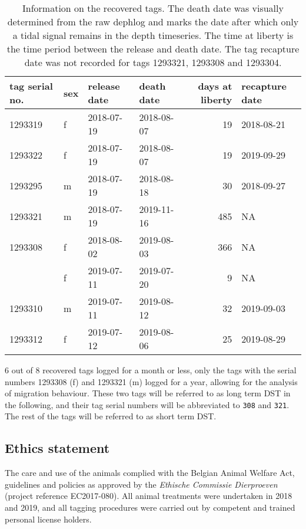 \documentclass[
  authoryear,
  review,
  3p]{elsarticle}
\begin{document}
\hypertarget{tbl-dstsum}{}
\begin{table}[H]
\caption{\label{tbl-dstsum}Information on the recovered tags. The death date was visually
determined from the raw dephlog and marks the date after which only a
tidal signal remains in the depth timeseries. The time at liberty is the
time period between the release and death date. The tag recapture date
was not recorded for tags 1293321, 1293308 and 1293304. }\tabularnewline

\centering
\begin{tabular}{llllrl}
\toprule
tag serial no. & sex & release date & death date & days at liberty & recapture date\\
\midrule
1293319 & f & 2018-07-19 & 2018-08-07 & 19 & 2018-08-21\\
1293322 & f & 2018-07-19 & 2018-08-07 & 19 & 2019-09-29\\
1293295 & m & 2018-07-19 & 2018-08-18 & 30 & 2018-09-27\\
1293321 & m & 2018-07-19 & 2019-11-16 & 485 & NA\\
1293308 & f & 2018-08-02 & 2019-08-03 & 366 & NA\\
\addlinespace
1293304 & f & 2019-07-11 & 2019-07-20 & 9 & NA\\
1293310 & m & 2019-07-11 & 2019-08-12 & 32 & 2019-09-03\\
1293312 & f & 2019-07-12 & 2019-08-06 & 25 & 2019-08-29\\
\bottomrule
\end{tabular}
\end{table}

6 out of 8 recovered tags logged for a month or less, only the tags with
the serial numbers 1293308 (f) and 1293321 (m) logged for a year,
allowing for the analysis of migration behaviour. These two tags will be
referred to as long term DST in the following, and their tag serial
numbers will be abbreviated to \texttt{308} and \texttt{321}. The rest
of the tags will be referred to as short term DST.

\hypertarget{ethics-statement}{%
\subsection{Ethics statement}\label{ethics-statement}}

The care and use of the animals complied with the Belgian Animal Welfare
Act, guidelines and policies as approved by the \emph{Ethische Commissie
Dierproeven} (project reference EC2017-080). All animal treatments were
undertaken in 2018 and 2019, and all tagging procedures were carried out
by competent and trained personal license holders.
\end{document}
